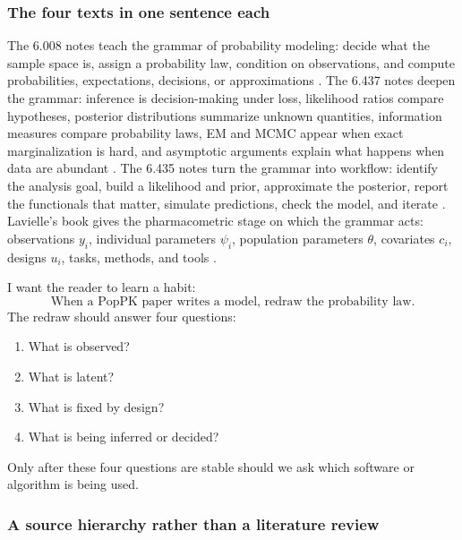 \subsubsection*{The four texts in one sentence each}

The 6.008 notes teach the grammar of probability modeling: decide what the sample space is, assign a probability law, condition on observations, and compute probabilities, expectations, decisions, or approximations \cite{mit6008notes}.  The 6.437 notes deepen the grammar: inference is decision-making under loss, likelihood ratios compare hypotheses, posterior distributions summarize unknown quantities, information measures compare probability laws, EM and MCMC appear when exact marginalization is hard, and asymptotic arguments explain what happens when data are abundant \cite{mit6437notes}.  The 6.435 notes turn the grammar into workflow: identify the analysis goal, build a likelihood and prior, approximate the posterior, report the functionals that matter, simulate predictions, check the model, and iterate \cite{mit6435notes}.  Lavielle's book gives the pharmacometric stage on which the grammar acts: observations \(y_i\), individual parameters \(\psi_i\), population parameters \(\theta\), covariates \(c_i\), designs \(u_i\), tasks, methods, and tools \cite{lavielle2015mixed}.

I want the reader to learn a habit:
\[
  \text{When a PopPK paper writes a model, redraw the probability law.}
\]
The redraw should answer four questions:
\begin{enumerate}[leftmargin=2em]
  \item What is observed?
  \item What is latent?
  \item What is fixed by design?
  \item What is being inferred or decided?
\end{enumerate}
Only after these four questions are stable should we ask which software or algorithm is being used.

\subsubsection*{A source hierarchy rather than a literature review}

